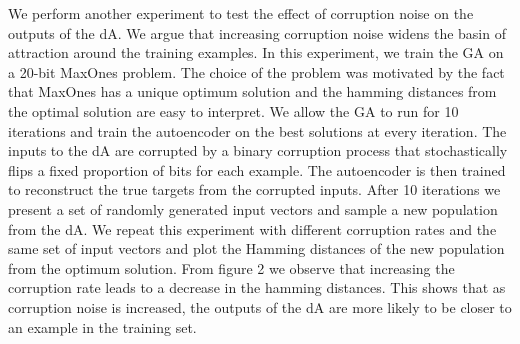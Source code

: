 \documentclass[runningheads,a4paper]{llncs}
\begin{document}

We perform another experiment to test the effect of corruption noise on the outputs of the dA. We argue that increasing corruption noise widens the basin of attraction around the training examples. In this experiment, we train the GA on a 20-bit MaxOnes problem. The choice of the problem was motivated by the fact that MaxOnes has a unique optimum solution and the hamming distances from the optimal solution are easy to interpret. We allow the GA to run for 10 iterations and train the autoencoder on the best solutions at every iteration. The inputs to the dA are corrupted by a binary corruption process that stochastically flips a fixed proportion of bits for each example. The autoencoder is then trained to reconstruct the true targets from the corrupted inputs. After 10 iterations we present a set of randomly generated input vectors and sample a new population from the dA. We repeat this experiment with different corruption rates and the same set of input vectors and plot the Hamming distances of the new population from the optimum solution. From figure 2 we observe that increasing the corruption rate leads to a decrease in the hamming distances. This shows that as corruption noise is increased, the outputs of the dA are more likely to be closer to an example in the training set. 



\end{document}
